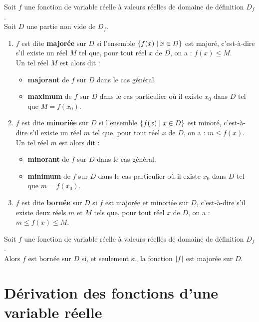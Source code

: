 \begin{defi}
	Soit \(f\) une fonction de variable réelle à valeurs réelles de domaine de définition \(D_f\). \\
	Soit \(D\) une partie non vide de \(D_f\).
	\begin{enumerate}
		\item \(f\) est dite \textbf{majorée} sur \(D\) si l'ensemble \(\left\lbrace f(x) \;\middle|\; x \in D\right\rbrace\) est majoré, c'est-à-dire s'il existe un réel \(M\) tel que, pour tout réel \(x\) de \(D\), on a : \(f(x) \leq M\).\\
		      Un tel réel \(M\) est alors dit :
		      \begin{itemize}
			      \item \textbf{majorant} de \(f\) sur \(D\) dans le cas général.
			      \item \textbf{maximum} de \(f\) sur \(D\) dans le cas particulier où il existe \(x_0\) dans \(D\) tel que \(M = f(x_0)\).
		      \end{itemize}
		\item \(f\) est dite \textbf{minoriée} sur \(D\) si l'ensemble \(\left\lbrace f(x) \;\middle|\; x \in D\right\rbrace\) est minoré, c'est-à-dire s'il existe un réel \(m\) tel que, pour tout réel \(x\) de \(D\), on a : \(m \leq f(x)\).\\
		      Un tel réel \(m\) est alors dit :
		      \begin{itemize}
			      \item \textbf{minorant} de \(f\) sur \(D\) dans le cas général.
			      \item \textbf{minimum} de \(f\) sur \(D\) dans le cas particulier où il existe \(x_0\) dans \(D\) tel que \(m = f(x_0)\).
		      \end{itemize}
		\item \(f\) est dite \textbf{bornée} sur \(D\) si \(f\) est majorée et minoriée sur \(D\), c'est-à-dire s'il existe deux réels \(m\) et \(M\) tels que, pour tout réel \(x\) de \(D\), on a : \(m \leq f(x) \leq M\).\end{enumerate}
\end{defi}

\begin{prop}
	Soit \(f\) une fonction de variable réelle à valeurs réelles de domaine de définition \(D_f\). \\
	Alors \(f\) est bornée sur \(D\) si, et seulement si, la fonction \(\left\lvert f\right\rvert\) est majorée sur \(D\).
\end{prop}
\section{Dérivation des fonctions d'une variable réelle}

